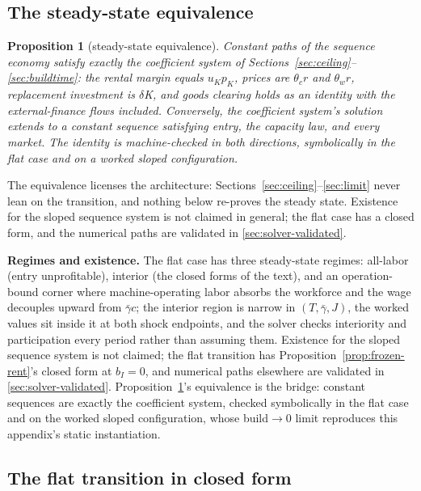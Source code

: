 \documentclass[12pt]{article}
\theoremstyle{plain}
\newtheorem{proposition}{Proposition}
\begin{document}
\subsection{The steady-state equivalence}\label{app:equivalence}

\begin{proposition}[steady-state equivalence]\label{prop:equivalence}
Constant paths of the sequence economy satisfy exactly the coefficient system of Sections~\ref{sec:ceiling}--\ref{sec:buildtime}: the rental margin equals $u_K p_K$, prices are $\theta _c r$ and $\theta _w r$, replacement investment is \emph{$\delta$K}, and goods clearing holds as an identity with the external-finance flows included. Conversely, the coefficient system's solution extends to a constant sequence satisfying entry, the capacity law, and every market. The identity is machine-checked in both directions, symbolically in the flat case and on a worked sloped configuration.
\end{proposition}

The equivalence licenses the architecture: Sections~\ref{sec:ceiling}--\ref{sec:limit} never lean on the transition, and nothing below re-proves the steady state. Existence for the sloped sequence system is not claimed in general; the flat case has a closed form, and the numerical paths are validated in \ref{sec:solver-validated}.

\textbf{Regimes and existence.} The flat case has three steady-state regimes: all-labor (entry unprofitable), interior (the closed forms of the text), and an operation-bound corner where machine-operating labor absorbs the workforce and the wage decouples upward from $\bar{\gamma}c$; the interior region is narrow in $(T, \bar{\gamma}, J)$, the worked values sit inside it at both shock endpoints, and the solver checks interiority and participation every period rather than assuming them. Existence for the sloped sequence system is not claimed; the flat transition has Proposition~\ref{prop:frozen-rent}'s closed form at $b_I = 0$, and numerical paths elsewhere are validated in \ref{sec:solver-validated}. Proposition~\ref{prop:equivalence}'s equivalence is the bridge: constant sequences are exactly the coefficient system, checked symbolically in the flat case and on the worked sloped configuration, whose build$\to 0$ limit reproduces this appendix's static instantiation.

\subsection{The flat transition in closed form}\label{sec:flat-closed}
\end{document}
